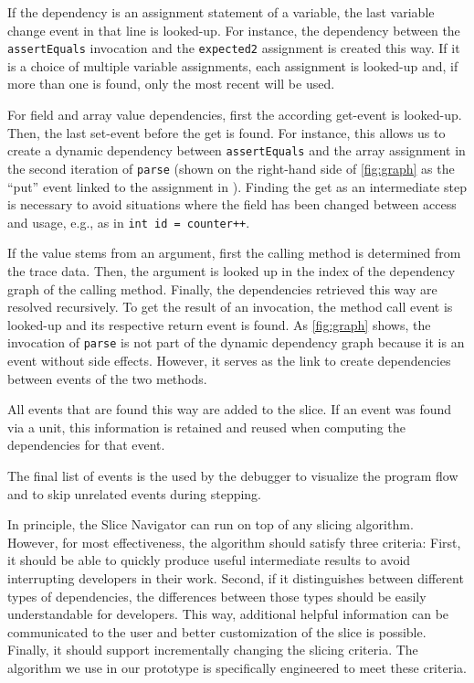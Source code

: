 If the dependency is an assignment statement of a variable, the last variable change event in that line is looked-up.
For instance, the dependency between the \verb+assertEquals+ invocation and the \verb+expected2+ assignment is created this way.
If it is a choice of multiple variable assignments, each assignment is looked-up and, if more than one is found, only the most recent will be used.

For field and array value dependencies, first the according get-event is looked-up.
Then, the last set-event before the get is found.
For instance, this allows us to create a dynamic dependency between \verb+assertEquals+ and the array assignment in the second iteration of \verb+parse+ (shown on the right-hand side of \autoref{fig:graph} as the ``put'' event linked to the assignment in ).
Finding the get as an intermediate step is necessary to avoid situations where the field has been changed between access and usage, e.g., as in \verb/int id = counter++/.

If the value stems from an argument, first the calling method is determined from the trace data. 
Then, the argument is looked up in the index of the dependency graph of the calling method.
Finally, the dependencies retrieved this way are resolved recursively.
To get the result of an invocation, the method call event is looked-up and its respective return event is found.
As \autoref{fig:graph} shows, the invocation of \verb+parse+ is not part of the dynamic dependency graph because it is an event without side effects.
However, it serves as the link to create dependencies between events of the two methods.

All events that are found this way are added to the slice.
If an event was found via a unit, this information is retained and reused when computing the dependencies for that event.

The final list of events is the used by the debugger to visualize the program flow and to skip unrelated events during stepping.

In principle, the Slice Navigator can run on top of any slicing algorithm.
However, for most effectiveness, the algorithm should satisfy three criteria:
First, it should be able to quickly produce useful intermediate results to avoid interrupting developers in their work.
Second, if it distinguishes between different types of dependencies, the differences between those types should be easily understandable for developers.
This way, additional helpful information can be communicated to the user and better customization of the slice is possible.
Finally, it should support incrementally changing the slicing criteria.
The algorithm we use in our prototype is specifically engineered to meet these criteria.

